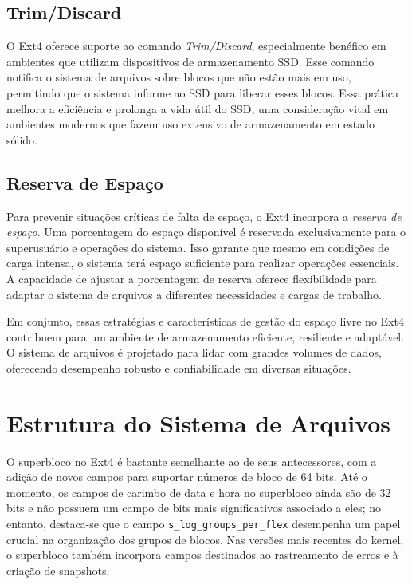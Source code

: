 \documentclass[
	12pt,				%
	openright,			%
	oneside,			%
	a4paper,			%
	chapter=TITLE,		%
	english,			%
	french,				%
	spanish,			%
	brazil				%
	]{abntex2}
\theoremstyle{definition}
\begin{document}
\section{Trim/Discard}

O Ext4 oferece suporte ao comando \textit{Trim/Discard}, especialmente benéfico em ambientes que utilizam dispositivos de armazenamento SSD. Esse comando notifica o sistema de arquivos sobre blocos que não estão mais em uso, permitindo que o sistema informe ao SSD para liberar esses blocos. Essa prática melhora a eficiência e prolonga a vida útil do SSD, uma consideração vital em ambientes modernos que fazem uso extensivo de armazenamento em estado sólido.

\section{Reserva de Espaço}

Para prevenir situações críticas de falta de espaço, o Ext4 incorpora a \textit{reserva de espaço}. Uma porcentagem do espaço disponível é reservada exclusivamente para o superusuário e operações do sistema. Isso garante que mesmo em condições de carga intensa, o sistema terá espaço suficiente para realizar operações essenciais. A capacidade de ajustar a porcentagem de reserva oferece flexibilidade para adaptar o sistema de arquivos a diferentes necessidades e cargas de trabalho.

Em conjunto, essas estratégias e características de gestão do espaço livre no Ext4 contribuem para um ambiente de armazenamento eficiente, resiliente e adaptável. O sistema de arquivos é projetado para lidar com grandes volumes de dados, oferecendo desempenho robusto e confiabilidade em diversas situações.

\chapter{Estrutura do Sistema de Arquivos}

O superbloco no Ext4 é bastante semelhante ao de seus antecessores, com a adição de novos campos para 
suportar números de bloco de 64 bits. Até o momento, os campos de carimbo de data e hora no superbloco 
ainda são de 32 bits e não possuem um campo de bits mais significativos associado a eles; no entanto, 
destaca-se que o campo \texttt{s\_log\_groups\_per\_flex} desempenha um papel crucial na organização 
dos grupos de blocos. Nas versões mais recentes do kernel, o superbloco também incorpora campos 
destinados ao rastreamento de erros e à criação de snapshots.
\end{document}
